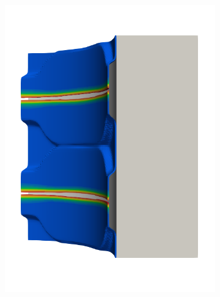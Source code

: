 \begin{frame}
\begin{columns}[T]
\begin{column}{0.6\textwidth}
\begin{figure}
{\begin{subfigure}{0.19\textwidth}
            \includegraphics[width=\textwidth]{examples/figures/seed_d_7}
          \end{subfigure}
          \hspace{0.06\textwidth}
          \begin{subfigure}{0.19\textwidth}
            \centering

\end{subfigure}}
\end{figure}
\end{column}
\end{columns}
\end{frame}
